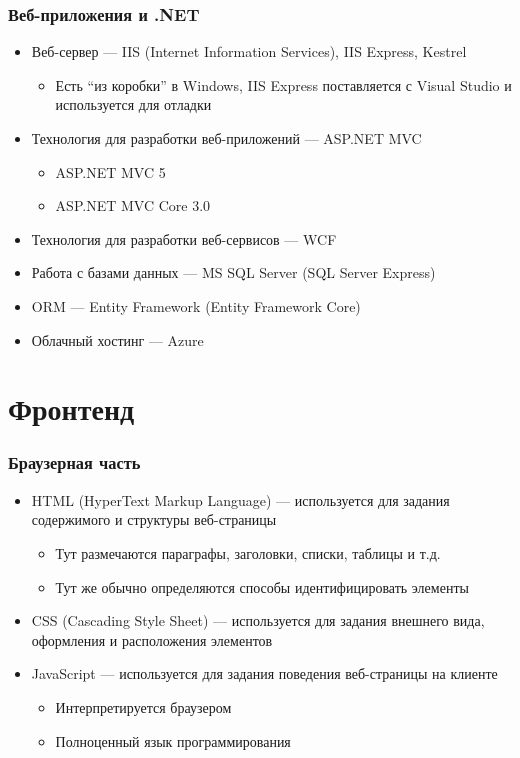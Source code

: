 \documentclass[xetex,mathserif,serif]{beamer}
\begin{document}
    \begin{frame}
        \frametitle{Веб-приложения и .NET}
        \begin{itemize}
            \item Веб-сервер --- IIS (Internet Information Services), IIS Express, Kestrel
            \begin{itemize}
                \item Есть ``из коробки'' в Windows, IIS Express поставляется с Visual Studio и используется для отладки
            \end{itemize}
            \item Технология для разработки веб-приложений --- ASP.NET MVC
            \begin{itemize}
                \item ASP.NET MVC 5
                \item ASP.NET MVC Core 3.0
            \end{itemize}
            \item Технология для разработки веб-сервисов --- WCF
            \item Работа с базами данных --- MS SQL Server (SQL Server Express)
            \item ORM --- Entity Framework (Entity Framework Core)
            \item Облачный хостинг --- Azure
        \end{itemize}
    \end{frame}

    \section{Фронтенд}

    \begin{frame}
        \frametitle{Браузерная часть}
        \begin{itemize}
            \item HTML (HyperText Markup Language) --- используется для задания содержимого и структуры веб-страницы
            \begin{itemize}
                \item Тут размечаются параграфы, заголовки, списки, таблицы и т.д.
                \item Тут же обычно определяются способы идентифицировать элементы
            \end{itemize}
            \item CSS (Cascading Style Sheet) --- используется для задания внешнего вида, оформления и расположения элементов
            \item JavaScript --- используется для задания поведения веб-страницы на клиенте
            \begin{itemize}
                \item Интерпретируется браузером
                \item Полноценный язык программирования
            \end{itemize}
        \end{itemize}
    \end{frame}
\end{document}
